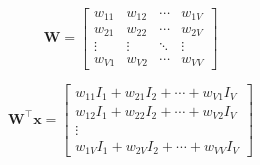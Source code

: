 \begin{notechapter}
\begin{minipage}[t]{.34\textwidth}
\[
\mathbf{W} = 
\begin{bmatrix}
w_{11} & w_{12} & \cdots & w_{1V} \\
w_{21} & w_{22} & \cdots & w_{2V} \\
\vdots & \vdots & \ddots & \vdots \\
w_{V1} & w_{V2} & \cdots & w_{VV}
\end{bmatrix}
\] 

\[
\mathbf{W}^\top \mathbf{x} = 
\begin{bmatrix}
w_{11} I_1 + w_{21} I_2 + \cdots + w_{V1} I_V \\
w_{12} I_1 + w_{22} I_2 + \cdots + w_{V2} I_V \\
\vdots \\
w_{1V} I_1 + w_{2V} I_2 + \cdots + w_{VV} I_V
\end{bmatrix}
\]
\end{minipage}


\end{notechapter}
